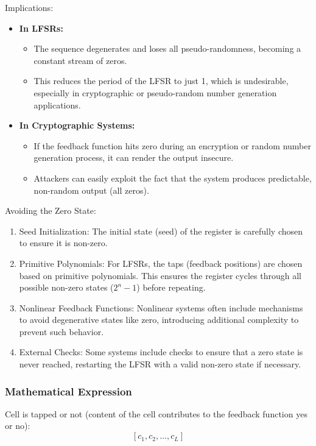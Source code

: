 Implications:
\begin{itemize}
    \item \textbf{In LFSRs:}
    \begin{itemize}
        \item The sequence degenerates and loses all pseudo-randomness, becoming a constant stream of zeros.
        \item This reduces the period of the LFSR to just 1, which is undesirable, especially in cryptographic or pseudo-random number generation applications.
    \end{itemize}
    
    \item \textbf{In Cryptographic Systems:}
    \begin{itemize}
        \item If the feedback function hits zero during an encryption or random number generation process, it can render the output insecure.
        \item Attackers can easily exploit the fact that the system produces predictable, non-random output (all zeros).
    \end{itemize}
\end{itemize}

Avoiding the Zero State:
\begin{enumerate}
    \item Seed Initialization: The initial state (seed) of the register is carefully chosen to ensure it is non-zero.
    \item Primitive Polynomials: For LFSRs, the taps (feedback positions) are chosen based on primitive polynomials. This ensures the register cycles through all possible non-zero states ($2^n - 1$) before repeating.
    \item Nonlinear Feedback Functions: Nonlinear systems often include mechanisms to avoid degenerative states like zero, introducing additional complexity to prevent such behavior.
    \item External Checks: Some systems include checks to ensure that a zero state is never reached, restarting the LFSR with a valid non-zero state if necessary.
\end{enumerate}

\subsubsection{Mathematical Expression}
Cell is tapped or not (content of the cell contributes to the feedback function yes or no):
\[
[c_1, c_2, \dots, c_L]
\]

